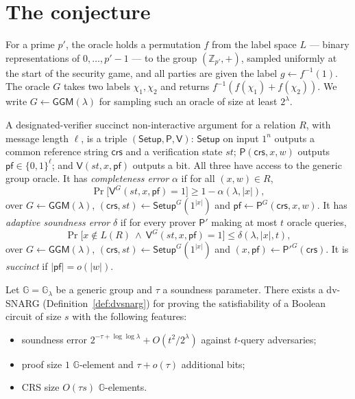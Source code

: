 \documentclass{conjura-conjecture}
\newcommand{\G}{\mathbb{G}}
\newcommand{\bits}{\{0,1\}}
\newcommand{\Setup}{\mathsf{Setup}}
\newcommand{\Prov}{\mathsf{P}}
\newcommand{\Ver}{\mathsf{V}}
\newcommand{\crs}{\mathsf{crs}}
\newcommand{\GGM}{\mathsf{GGM}}
\newcommand{\pf}{\mathsf{pf}}
\begin{document}
\section{The conjecture}\label{sec:conjectures}

\begin{definition}\label{def:ggm}
For a prime $p'$, the oracle holds a permutation $f$ from the label space
$L$ --- binary representations of $0, \dots, p'-1$ --- to the group
$(\mathbb{Z}_{p'}, +)$, sampled uniformly at the start of the security
game, and all parties are given the label $g \leftarrow f^{-1}(1)$. The
oracle $G$ takes two labels $\chi_{1}, \chi_{2}$ and returns
$f^{-1}(f(\chi_{1}) + f(\chi_{2}))$. We write $G \leftarrow \GGM(\lambda)$
for sampling such an oracle of size at least $2^{\lambda}$.
\end{definition}

\begin{definition}\label{def:dvsnarg}
A designated-verifier succinct non-interactive argument for a relation
$R$, with message length $\ell$, is a triple $(\Setup, \Prov, \Ver)$:
$\Setup$ on input $1^{n}$ outputs a common reference string $\crs$ and a
verification state $st$; $\Prov(\crs, x, w)$ outputs $\pf \in
\bits^{\ell}$; and $\Ver(st, x, \pf)$ outputs a bit. All three have
access to the generic group oracle. It has \emph{completeness error}
$\alpha$ if for all $(x,w) \in R$,
\[
  \Pr\bigl[ \Ver^{G}(st, x, \pf) = 1 \bigr] \ge 1 - \alpha(\lambda,|x|),
\]
over $G \leftarrow \GGM(\lambda)$, $(\crs, st) \leftarrow
\Setup^{G}(1^{|x|})$ and $\pf \leftarrow \Prov^{G}(\crs, x, w)$. It has
\emph{adaptive soundness error} $\delta$ if for every prover $\Prov'$
making at most $t$ oracle queries,
\[
  \Pr\bigl[ x \notin L(R) \ \wedge\ \Ver^{G}(st,x,\pf) = 1 \bigr]
  \le \delta(\lambda, |x|, t),
\]
over $G \leftarrow \GGM(\lambda)$, $(\crs, st) \leftarrow
\Setup^{G}(1^{|x|})$ and $(x, \pf) \leftarrow \Prov'^{G}(\crs)$. It is
\emph{succinct} if $|\pf| = o(|w|)$.
\end{definition}

\begin{conjecture}\label{conj:main}
Let $\G = \G_{\lambda}$ be a generic group and $\tau$ a soundness
parameter. There exists a dv-SNARG (Definition~\ref{def:dvsnarg}) for
proving the satisfiability of a Boolean circuit of size $s$ with the
following features:
\begin{itemize}[nosep]
  \item soundness error $2^{-\tau + \log\log\lambda} + O(t^{2}/2^{\lambda})$
    against $t$-query adversaries;
  \item proof size $1$ $\G$-element and $\tau + o(\tau)$ additional bits;
  \item CRS size $O(\tau s)$ $\G$-elements.
\end{itemize}
\end{conjecture}
\end{document}
